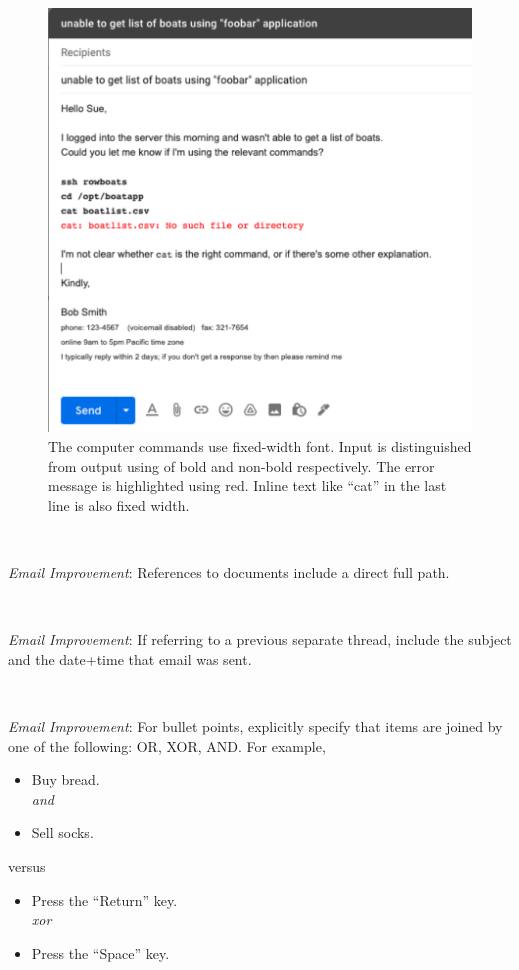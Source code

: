 \begin{figure}%
\includegraphics[width=1\textwidth]{images/email_computer_font.pdf}
\caption{The computer commands use fixed-width font. Input is distinguished from output using of bold and non-bold respectively. The error message is highlighted using red. Inline text like ``cat'' in the last line is also fixed width.}
\label{fig:email_computer_font}
\end{figure}

\ \\
\begin{samepage}
\textit{Email Improvement}: References to documents include a direct full path.
\end{samepage}

\ \\
\begin{samepage}
\textit{Email Improvement}: If referring to a previous separate thread, include the subject and the date+time that email was sent.
\end{samepage}

\ \\
\begin{samepage}
\textit{Email Improvement}: For bullet points, explicitly specify that items are joined by one of the following: OR, XOR, AND. For example,
\begin{itemize}
    \item Buy bread.\\
    \textit{and}
    \item Sell socks.
\end{itemize}
versus
\begin{itemize}
    \item Press the ``Return'' key.\\
    \textit{xor}
    \item Press the ``Space'' key.
\end{itemize}
\end{samepage}

